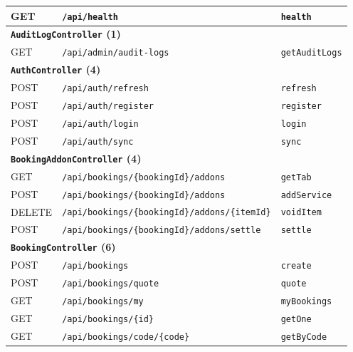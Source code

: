 {\begin{longtable}{|p{1.5cm}|p{7.3cm}|p{5.0cm}|}
\hline
GET & \texttt{/\allowbreak api/\allowbreak health} & \texttt{health} \\
\hline
\multicolumn{3}{|l|}{\textbf{\texttt{AuditLogController} (1)}} \\
\hline
GET & \texttt{/\allowbreak api/\allowbreak admin/\allowbreak audit-logs} & \texttt{getAuditLogs} \\
\hline
\multicolumn{3}{|l|}{\textbf{\texttt{AuthController} (4)}} \\
\hline
POST & \texttt{/\allowbreak api/\allowbreak auth/\allowbreak refresh} & \texttt{refresh} \\
\hline
POST & \texttt{/\allowbreak api/\allowbreak auth/\allowbreak register} & \texttt{register} \\
\hline
POST & \texttt{/\allowbreak api/\allowbreak auth/\allowbreak login} & \texttt{login} \\
\hline
POST & \texttt{/\allowbreak api/\allowbreak auth/\allowbreak sync} & \texttt{sync} \\
\hline
\multicolumn{3}{|l|}{\textbf{\texttt{BookingAddonController} (4)}} \\
\hline
GET & \texttt{/\allowbreak api/\allowbreak bookings/\allowbreak \{bookingId\}/\allowbreak addons} & \texttt{getTab} \\
\hline
POST & \texttt{/\allowbreak api/\allowbreak bookings/\allowbreak \{bookingId\}/\allowbreak addons} & \texttt{addService} \\
\hline
DELETE & \texttt{/\allowbreak api/\allowbreak bookings/\allowbreak \{bookingId\}/\allowbreak addons/\allowbreak \{itemId\}} & \texttt{voidItem} \\
\hline
POST & \texttt{/\allowbreak api/\allowbreak bookings/\allowbreak \{bookingId\}/\allowbreak addons/\allowbreak settle} & \texttt{settle} \\
\hline
\multicolumn{3}{|l|}{\textbf{\texttt{BookingController} (6)}} \\
\hline
POST & \texttt{/\allowbreak api/\allowbreak bookings} & \texttt{create} \\
\hline
POST & \texttt{/\allowbreak api/\allowbreak bookings/\allowbreak quote} & \texttt{quote} \\
\hline
GET & \texttt{/\allowbreak api/\allowbreak bookings/\allowbreak my} & \texttt{myBookings} \\
\hline
GET & \texttt{/\allowbreak api/\allowbreak bookings/\allowbreak \{id\}} & \texttt{getOne} \\
\hline
GET & \texttt{/\allowbreak api/\allowbreak bookings/\allowbreak code/\allowbreak \{code\}} & \texttt{getByCode} \\

\end{longtable}}
